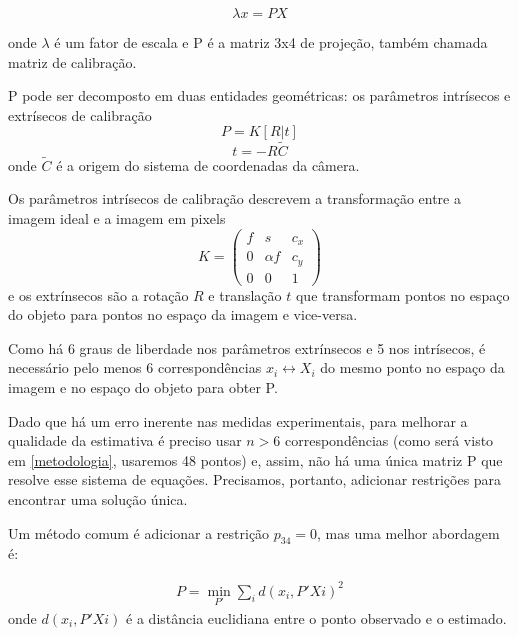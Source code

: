 \documentclass[conference]{IEEEtran}
\begin{document}
\begin{equation}\lambda  x = P  X\end{equation}

onde \(\lambda\) é um fator de escala e P é a matriz 3x4 de projeção, também chamada matriz de calibração.

P pode ser decomposto em duas entidades geométricas: os parâmetros intrísecos e extrísecos de calibração\cite{tese}
\begin{equation}
P = K [R | t]
\end{equation}
\begin{equation}
t = -R\widetilde{C}
\end{equation}
onde \(\widetilde{C}\) é a origem do sistema de coordenadas da câmera\cite{Hartley2004}.

Os parâmetros intrísecos de calibração descrevem a transformação entre a imagem ideal e a imagem em pixels
\begin{equation}
K = \begin{pmatrix} 
f & s & c_x \\
0 & \alpha f & c_y\\
0 & 0 & 1
\end{pmatrix}
\end{equation}
e os extrínsecos são a rotação \(R\) e translação \(t\) que transformam pontos no espaço do objeto para pontos no espaço da imagem e vice-versa\cite{tese}.

Como há 6 graus de liberdade nos parâmetros extrínsecos e 5 nos intrísecos, é necessário pelo menos 6 correspondências \({x_i \leftrightarrow X_i}\) do mesmo ponto no espaço da imagem e no espaço do objeto para obter P\cite{tese}. 

Dado que há um erro inerente nas medidas experimentais, para melhorar a qualidade da estimativa é preciso usar \(n > 6\) correspondências (como será visto em \ref{metodologia}, usaremos 48 pontos) e, assim, não há uma única matriz P que resolve esse sistema de equações. Precisamos, portanto, adicionar restrições para encontrar uma solução única.  

Um método comum é adicionar a restrição \(p_{34} = 0\)\cite{Hartley2004}, mas uma melhor abordagem\cite{tese} é:

\begin{equation}
\begin{aligned}
P = \min_{P'} \sum_{i}d(x_i, P'Xi)^2
\end{aligned}
\end{equation}
onde \(d(x_i, P'Xi) \) é a distância euclidiana entre o ponto observado e o estimado. 
\end{document}
